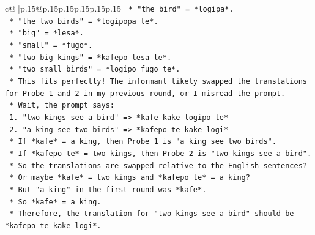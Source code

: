 \documentclass{article}
\begin{document}
{\begin{supertabular}{c@{$\;$}|p{.15\linewidth}@{}p{.15\linewidth}p{.15\linewidth}p{.15\linewidth}p{.15\linewidth}p{.15\linewidth}}
{{{\texttt{                                                        *   "the bird" = *logipa*.} \\
\texttt{                                                        *   "the two birds" = *logipopa te*.} \\
\texttt{                                                        *   "big" = *lesa*.} \\
\texttt{                                                        *   "small" = *fugo*.} \\
\texttt{                                                        *   "two big kings" = *kafepo lesa te*.} \\
\texttt{                                                        *   "two small birds" = *logipo fugo te*.} \\
\texttt{                                                    *   This fits perfectly! The informant likely swapped the translations for Probe 1 and 2 in my previous round, or I misread the prompt.} \\
\texttt{                                                    *   Wait, the prompt says:} \\
\texttt{                                                        1. "two kings see a bird" => *kafe kake logipo te*} \\
\texttt{                                                        2. "a king see two birds" => *kafepo te kake logi*} \\
\texttt{                                                    *   If *kafe* = a king, then Probe 1 is "a king see two birds".} \\
\texttt{                                                    *   If *kafepo te* = two kings, then Probe 2 is "two kings see a bird".} \\
\texttt{                                                    *   So the translations are swapped relative to the English sentences?} \\
\texttt{                                                    *   Or maybe *kafe* = two kings and *kafepo te* = a king?} \\
\texttt{                                                    *   But "a king" in the first round was *kafe*.} \\
\texttt{                                                    *   So *kafe* = a king.} \\
\texttt{                                                    *   Therefore, the translation for "two kings see a bird" should be *kafepo te kake logi*.} \\
}}}
\end{supertabular}}
\end{document}
